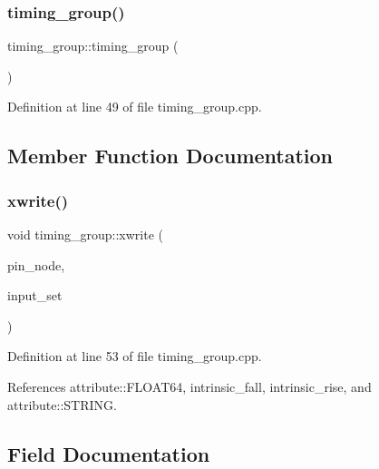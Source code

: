 \subsubsection{\texorpdfstring{timing\+\_\+group()}{timing\_group()}}
{\footnotesize\ttfamily timing\+\_\+group\+::timing\+\_\+group (\begin{DoxyParamCaption}{ }\end{DoxyParamCaption})}



Definition at line 49 of file timing\+\_\+group.\+cpp.



\subsection{Member Function Documentation}
\mbox{\label{structtiming__group_adc04799a8abb0eda2eeff30a409c19f2}} 
\subsubsection{\texorpdfstring{xwrite()}{xwrite()}}
{\footnotesize\ttfamily void timing\+\_\+group\+::xwrite (\begin{DoxyParamCaption}\item[{\hyperlink{classxml__element}{xml\+\_\+element} $\ast$}]{pin\+\_\+node,  }\item[{const \hyperlink{classCustomOrderedSet}{Custom\+Ordered\+Set}$<$ std\+::string $>$ \&}]{input\+\_\+set }\end{DoxyParamCaption})}



Definition at line 53 of file timing\+\_\+group.\+cpp.



References attribute\+::\+F\+L\+O\+A\+T64, intrinsic\+\_\+fall, intrinsic\+\_\+rise, and attribute\+::\+S\+T\+R\+I\+NG.



\subsection{Field Documentation}
\mbox{\label{structtiming__group_a111262e8635422eb639f132b55f2be85}} 
